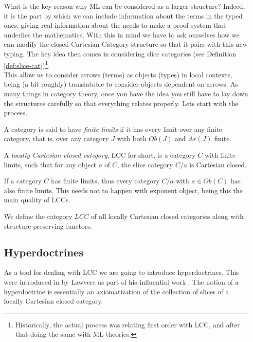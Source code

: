 What is the key reason why ML can be considered as a larger structure? Indeed, it is the part by which we can include information about the terms in the typed ones, giving real information about the needs to make a proof system that underlies the mathematics. With this in mind we have to ask ourselves how we can modify the closed Cartesian Category structure so that it pairs with this new typing.  The key idea then comes in considering slice categories (see Definition \ref{def:slice-cat})\footnote{Historically, the actual process was relating first order with LCC, and after that doing the same with ML theories.}.\\

This allow us to consider arrows (terms) as objects (types) in local contexts, being (a bit roughly) translatable to consider objects dependent on arrows.  As many things in category theory, once you have the idea you still have to lay down the structures carefully so that everything relates properly. Lets start with the process.

\begin{definition}
  A category is said to have \emph{finite limits} if it has every limit over any finite category, that is, over any category $J$ with both $Ob(J)$ and $Ar(J)$ finite.
\end{definition}

\begin{definition}
  A \emph{locally Cartesian closed category}, LCC for short,  is a category $C$ with finite limits, such that for any object $a$ of $C$, the slice category $C/a $ is Cartesian closed.
\end{definition}

\begin{remark}
  If a category $C$ has finite limits, thus every category $C/a$ with $a\in Ob(C)$  has also finite limits. This needs not to happen with exponent object, being this the main quality of LCCs.
\end{remark}

\begin{definition}
  We define the category $LCC$ of all locally Cartesian closed categories along with structure preserving functors.
\end{definition}
\subsection{Hyperdoctrines}


As a tool for dealing with LCC we are going to introduce hyperdoctrines. This were introduced in by Lawvere as part of his influential work \cite{lawvere1969adjointness}. The notion of a hyperdoctrine is essentially an axiomatization of the collection of slices of a locally Cartesian closed category\cite{nlab:hyperdoctrine}.

